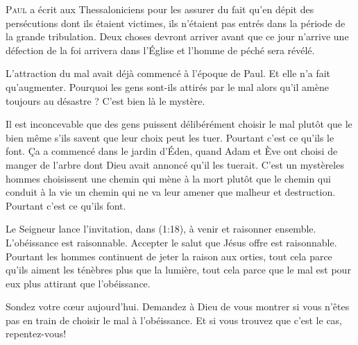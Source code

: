 



\lettrine{P}{aul} a écrit aux Thessaloniciens pour les assurer du fait
 qu'en dépit des persécutions dont ils étaient victimes,
 ils n'étaient pas entrés dans la période de la grande tribulation.
 Deux choses devront arriver avant que ce jour n'arrive\frcolon
 une défection de la foi arrivera dans l'Église 
 et l'homme de péché sera révélé.

L'attraction du mal avait déjà commencé à l'époque de Paul.
 Et elle n'a fait qu'augmenter. Pourquoi 
 les gens sont-ils attirés
 par le mal alors qu'il amène toujours au désastre ?
 C'est bien là le mystère.


Il est inconcevable que des gens puissent délibérément choisir le mal
 plutôt que le bien \ocadr même s'ils savent que leur choix peut les tuer.
 Pourtant c'est ce qu'ils le font.
 Ça a commencé dans le jardin d'Éden, quand Adam et Ève ont choisi de manger
 de l'arbre dont Dieu avait annoncé qu'il les tuerait.
 C'est un mystère\frcolon les hommes choisissent une chemin qui mène à la mort
 plutôt que le chemin qui conduit à la vie
 \ocadr un chemin qui ne va leur amener que malheur et destruction.
 Pourtant c'est ce qu'ils font.

Le Seigneur lance l'invitation, dans (1:18),
 à \Og venir et raisonner ensemble. \Fg{} L'obéissance est raisonnable.
 Accepter le salut que Jésus offre est raisonnable.
 Pourtant les hommes continuent  de jeter la raison aux orties,
 tout cela parce qu'ils aiment les ténèbres plus que la lumière,
 tout cela parce que le mal est pour eux plus attirant que l'obéissance.

Sondez votre c\oe{}ur aujourd'hui. Demandez à Dieu de vous montrer
 si vous n'êtes pas en train de choisir le mal à l'obéissance.
 Et si vous trouvez que c'est le cas, repentez-vous!

\dvrule



